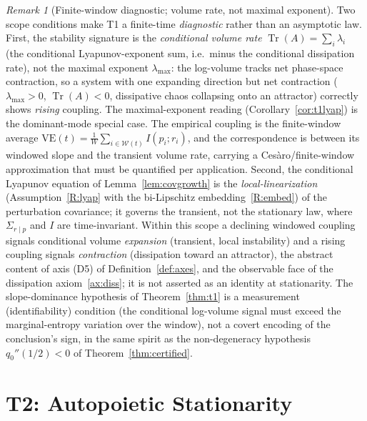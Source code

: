 \documentclass[11pt]{article}
\theoremstyle{plain}
\theoremstyle{definition}
\theoremstyle{remark}
\newtheorem{remark}[theorem]{Remark}
\begin{document}
\begin{remark}[Finite-window diagnostic; volume rate, not maximal exponent]\label{rem:t1scope}
Two scope conditions make T1 a finite-time \emph{diagnostic} rather than an asymptotic law. First, the stability signature is the \emph{conditional volume rate} $\operatorname{Tr}(A)=\sum_i\lambda_i$ (the conditional Lyapunov-exponent sum, i.e.\ minus the conditional dissipation rate), not the maximal exponent $\lambda_{\max}$: the log-volume tracks net phase-space contraction, so a system with one expanding direction but net contraction ($\lambda_{\max}>0$, $\operatorname{Tr}(A)<0$, dissipative chaos collapsing onto an attractor) correctly shows \emph{rising} coupling. The maximal-exponent reading (Corollary~\ref{cor:t1lyap}) is the dominant-mode special case. The empirical coupling is the finite-window average $\mathrm{VE}(t)=\tfrac1W\sum_{i\in\mathcal W(t)}I(p_i;r_i)$, and the correspondence is between its windowed slope and the transient volume rate, carrying a Ces\`aro/finite-window approximation that must be quantified per application. Second, the conditional Lyapunov equation of Lemma~\ref{lem:covgrowth} is the \emph{local-linearization} (Assumption~\ref{R:lyap} with the bi-Lipschitz embedding~\ref{R:embed}) of the perturbation covariance; it governs the transient, not the stationary law, where $\Sigma_{r\mid p}$ and $I$ are time-invariant. Within this scope a declining windowed coupling signals conditional volume \emph{expansion} (transient, local instability) and a rising coupling signals \emph{contraction} (dissipation toward an attractor), the abstract content of axis (D5) of Definition~\ref{def:axes}, and the observable face of the dissipation axiom~\ref{ax:diss}; it is not asserted as an identity at stationarity. The slope-dominance hypothesis of Theorem~\ref{thm:t1} is a measurement (identifiability) condition (the conditional log-volume signal must exceed the marginal-entropy variation over the window), not a covert encoding of the conclusion's sign, in the same spirit as the non-degeneracy hypothesis $q_0''(1/2)<0$ of Theorem~\ref{thm:certified}.
\end{remark}

\section{T2: Autopoietic Stationarity}\label{sec:t2}
\end{document}
